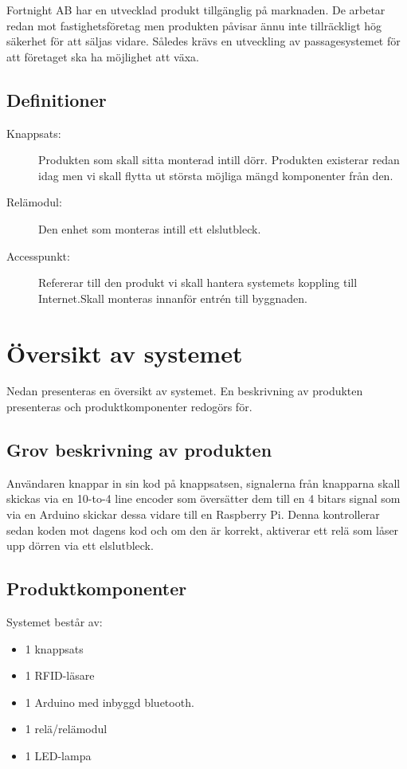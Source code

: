 \documentclass{article}
\begin{document}
\begin{multicols*}{2}
Fortnight AB har en utvecklad produkt tillgänglig på marknaden. De arbetar redan mot fastighetsföretag men produkten påvisar ännu inte tillräckligt hög säkerhet för att säljas vidare. Således krävs en utveckling av passagesystemet för att företaget ska ha möjlighet att växa. 

\subsection{Definitioner}
\begin{description}
    \item[Knappsats:] Produkten som skall sitta monterad intill dörr. Produkten existerar redan idag men vi skall flytta ut största möjliga mängd komponenter från den.
    \item[Relämodul:] Den enhet som monteras intill ett elslutbleck.
    \item[Accesspunkt:] Refererar till den produkt vi skall hantera systemets koppling till Internet.Skall monteras innanför entrén till byggnaden.
\end{description}

\newpage
\section{Översikt av systemet}
Nedan presenteras en översikt av systemet. En beskrivning av produkten presenteras och produktkomponenter redogörs för.

\subsection{Grov beskrivning av produkten}
Användaren knappar in sin kod på knappsatsen, signalerna från knapparna skall skickas via en 10-to-4 line encoder som översätter dem till en 4 bitars signal som via en Arduino skickar dessa vidare till en Raspberry Pi. Denna kontrollerar sedan koden mot dagens kod och om den är korrekt, aktiverar ett relä som låser upp dörren via ett elslutbleck.

\subsection{Produktkomponenter}
Systemet består av:
\begin{itemize}
    \item 1 knappsats
    \item 1 RFID-läsare
    \item 1 Arduino med inbyggd bluetooth.
    \item 1 relä/relämodul
    \item 1 LED-lampa
    

\end{itemize}
\end{multicols*}
\end{document}
